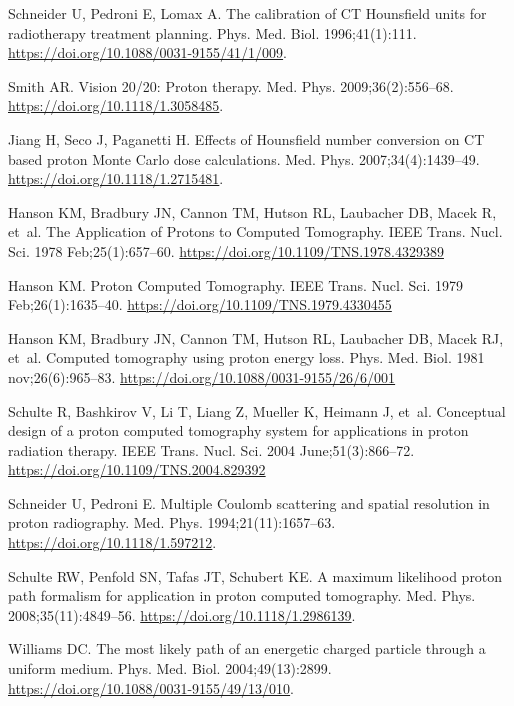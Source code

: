 \documentclass[preprint,times]{elsarticle}
\begin{document}
\begin{thebibliography}{99}

Schneider U, Pedroni E, Lomax A. The calibration of CT Hounsfield units for radiotherapy treatment planning. Phys. Med. Biol. 1996;41(1):111. \url{https://doi.org/10.1088/0031-9155/41/1/009}.

Smith AR. Vision 20/20: Proton therapy. Med. Phys. 2009;36(2):556--68. \url{https://doi.org/10.1118/1.3058485}.

Jiang H, Seco J, Paganetti H. Effects of Hounsfield number conversion on CT based proton Monte Carlo dose calculations. Med. Phys. 2007;34(4):1439--49. \url{https://doi.org/10.1118/1.2715481}.

{Hanson} KM, {Bradbury} JN, {Cannon} TM, {Hutson} RL, {Laubacher} DB, {Macek} R, et~al. The Application of Protons to Computed Tomography. IEEE Trans. Nucl. Sci. 1978 Feb;25(1):657--60. \url{https://doi.org/10.1109/TNS.1978.4329389}

{Hanson} KM. Proton Computed Tomography. IEEE Trans. Nucl. Sci. 1979 Feb;26(1):1635--40. \url{https://doi.org/10.1109/TNS.1979.4330455}

Hanson KM, Bradbury JN, Cannon TM, Hutson RL, Laubacher DB, Macek RJ, et~al. Computed tomography using proton energy loss. Phys. Med. Biol. 1981 nov;26(6):965--83. \url{https://doi.org/10.1088/0031-9155/26/6/001}

Schulte R, Bashkirov V, Li T, Liang Z, Mueller K, Heimann J, et~al. Conceptual design of a proton computed tomography system for applications in proton radiation therapy. IEEE Trans. Nucl. Sci. 2004 June;51(3):866--72. \url{https://doi.org/10.1109/TNS.2004.829392}

Schneider U, Pedroni E. Multiple Coulomb scattering and spatial resolution in proton radiography. Med. Phys. 1994;21(11):1657--63. \url{https://doi.org/10.1118/1.597212}.

Schulte RW, Penfold SN, Tafas JT, Schubert KE. A maximum likelihood proton path formalism for application in proton computed tomography. Med. Phys. 2008;35(11):4849--56. \url{https://doi.org/10.1118/1.2986139}.

Williams DC. The most likely path of an energetic charged particle through a uniform medium. Phys. Med. Biol. 2004;49(13):2899. \url{https://doi.org/10.1088/0031-9155/49/13/010}.


\end{thebibliography}
\end{document}
